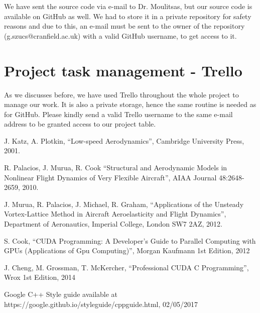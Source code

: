 \documentclass[a4paper, 11pt, article]{report}
\begin{document}
We have sent the source code via e-mail to Dr. Moulitsas, but our source code is available on GitHub as well. We had to store it in a private repository for safety reasons and due to this, an e-mail must be sent to the owner of the repository (g.szucs@cranfield.ac.uk) with a valid GitHub username, to get access to it. 

\section{Project task management - Trello}

As we discusses before, we have used Trello throughout the whole project to manage our work. It is also a private storage, hence the same routine is needed as for GitHub. Please kindly send a valid Trello username to the same e-mail address to be granted access to our project table. 


\begingroup
\renewcommand{\section}[2]{}%
\begin{thebibliography}{1}

 J. Katz, A. Plotkin, “Low-speed Aerodynamics”, Cambridge University Press, 2001.

 R. Palacios, J. Murua, R. Cook “Structural and Aerodynamic Models in Nonlinear Flight Dynamics of Very Flexible Aircraft”, AIAA Journal 48:2648-2659, 2010.

 J. Murua, R. Palacios, J. Michael, R. Graham, “Applications of the Unsteady Vortex-Lattice Method in Aircraft Aeroelasticity and Flight Dynamics”, Department of Aeronautics, Imperial College, London SW7 2AZ, 2012.

 S. Cook, “CUDA Programming: A Developer's Guide to Parallel Computing with GPUs (Applications of Gpu Computing)”, Morgan Kaufmann 1st Edition, 2012

 J. Cheng, M. Grossman, T. McKercher, “Professional CUDA C Programming”, Wrox 1st Edition, 2014

 Google C++ Style guide available at https://google.github.io/styleguide/cppguide.html, 02/05/2017

\end{thebibliography}
\endgroup
   
\end{document}
